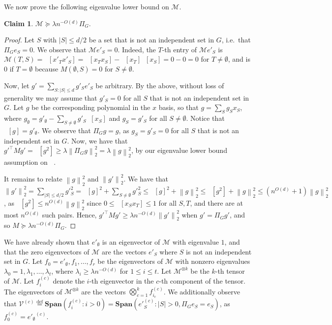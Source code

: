 \documentclass[10pt,a4paper]{article}
\theoremstyle{definition}
\newtheorem{claim}[theorem]{Claim}
\newcommand{\defeq}{\stackrel{\mathrm{def}}=}
\newcommand{\cV}{\mathcal V}
\DeclareMathOperator{\pE}{\tilde{\mathbb{E}}}
\def\Span#1{\textbf{Span}\left(#1  \right)}
\def\defeq{\stackrel{\mathrm{def}}{=}}
\def\abs#1{\left|#1  \right|}
\def\norm#1{\left\| #1 \right\|}
\newcommand{\M}{\mathcal{M}}
\newcommand{\numcolors}{k}
\begin{document}
We now prove the following eigenvalue lower bound on $\M$.
\begin{claim}
$\M \succeq \lambda n^{-O(d)} \Pi_G$.
\end{claim}
\begin{proof}
Let $S$ with $\abs{S} \leq d/2$ be a set that is not an independent set in $G$, i.e.\ that $\Pi_G e_S = 0$. We observe that $\M e'_S = 0$. Indeed, the $T$-th entry of $\M e'_S$ is $\M(T, S) = \pE[x'_T x'_S] = \pE[x_T x_S] - \pE[x_T] \pE[x_S] = 0 - 0 = 0$ for $T \ne \emptyset$, and is $0$ if $T = \emptyset$ because $M(\emptyset, S) = 0$ for $S \ne \emptyset$.

Now, let $g' = \sum_{S: \abs{S} \leq d} g'_S e'_{S}$ be arbitrary. By the above, without loss of generality we may assume that $g'_S = 0$ for all $S$ that is not an independent set in $G$. Let $g$ be the corresponding polynomial in the $x$ basis, so that $g = \sum_{S} g_S x_S$, where $g_\emptyset = g'_{\emptyset}  - \sum_{S \ne \emptyset} g'_S \pE[x_S]$ and $g_S = g'_S$ for all $S \ne \emptyset$. Notice that $\pE[g] = g'_{\emptyset}$. We observe that $\Pi_G g = g$, as $g_S = g'_S = 0$ for all $S$ that is not an independent set in $G$. Now, we have that $g'^{\top} M g' = \pE[g^2] \geq \lambda \norm{\Pi_G g}_2^2 = \lambda \norm{g}_2^2$, by our eigenvalue lower bound assumption on $\pE$.

It remains to relate $\norm{g}_2^2$ and $\norm{g'}_2^2$. We have that $\norm{g'}_2^2 = \sum_{\abs{S} \leq d/2} g'^2_S = \pE[g]^2 +  \sum_{S \ne \emptyset} g'^2_S \leq \pE[g]^2 + \norm{g}_2^2 \leq \pE[g^2] + \norm{g}_2^2 \leq (n^{O(d)} + 1) \norm{g}_2^2$, as $\pE[g^2] \leq n^{O(d)} \norm{g}_2^2$ since $0 \leq \pE[x_S x_T] \leq 1$ for all $S,T$, and there are at most $n^{O(d)}$ such pairs. Hence, $g'^{\top} M g' \geq \lambda n^{-O(d)} \norm{g'}_2^2$ when $g' = \Pi_G g'$, and so $M \succeq \lambda n^{-O(d)} \Pi_G$.
\end{proof}

We have already shown that $e'_{\emptyset}$ is an eigenvector of $\M$ with eigenvalue $1$, and that the zero eigenvectors of $\M$ are the vectors $e'_{S}$ where $S$ is not an independent set in $G$. Let $f_0 = e'_{\emptyset}, f_1, \dots, f_r$ be the eigenvectors of $\M$ with nonzero eigenvalues $\lambda_0 = 1, \lambda_1, \dots, \lambda_t$, where $\lambda_i \geq \lambda n^{-O(d)}$ for $1 \leq i \leq t$. Let $\M^{\otimes \numcolors}$ be the $\numcolors$-th tensor of $\M$. Let $f_{i}^{(c)}$ denote the $i$-th eigenvector in the $c$-th component of the tensor. The eigenvectors of $\M^{\otimes \numcolors}$ are the vectors $\bigotimes_{c = 1}^\numcolors f_{i_c}^{(c)}$. We additionally observe that $\cV^{(c)} \defeq \Span{f_i^{(c)} : i > 0} = \Span{e'^{(c)}_S : \abs{S} > 0, \Pi_G e_S = e_S}$, as $f_0^{(c)} = {e'_{\emptyset}}^{(c)}$. 
\end{document}
